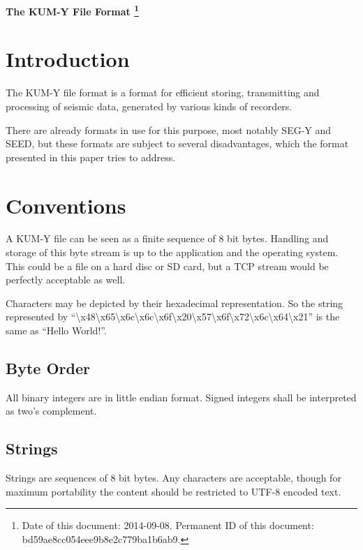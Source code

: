 \documentclass[DIV=10]{scrartcl}
\newcommand{\x}[1]{\textbackslash{}x#1}
\begin{document}
\strut

\vspace{1cm}

\centerline{\huge \textbf{The KUM-Y File Format%
\footnote{\raggedright Date of this document: 2014-09-08.
Permanent ID of this document: bd59ae8cc054eee9b8e2c779ba1b6ab9.}}}

\vspace{1cm}

\section{Introduction}

The KUM-Y file format is a format for efficient storing, transmitting and processing of seismic data, generated by various kinds of recorders.

There are already formats in use for this purpose, most notably SEG-Y and SEED, but these formats are subject to several disadvantages, which the format presented in this paper tries to address.

\section{Conventions}

A KUM-Y file can be seen as a finite sequence of 8 bit bytes.
Handling and storage of this byte stream is up to the application and the operating system.
This could be a file on a hard disc or SD card, but a TCP stream would be perfectly acceptable as well.

Characters may be depicted by their hexadecimal representation.
So the string represented by “\x{48}\x{65}\x{6c}\x{6c}\x{6f}\x{20}\x{57}\x{6f}\x{72}\x{6c}\x{64}\x{21}” is the same as “Hello World!”.

\subsection{Byte Order}

All binary integers are in little endian format.
Signed integers shall be interpreted as two’s complement.

\subsection{Strings}

Strings are sequences of 8 bit bytes.
Any characters are acceptable, though for maximum portability the content should be restricted to UTF-8 encoded text.
\end{document}
